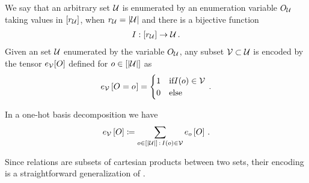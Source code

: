 \begin{definition}\label{def:subsetEncoding}
	We say that an arbitrary set $\mathcal{U}$ is enumerated by an enumeration variable $O_{\mathcal{U}}$ taking values in $[r_{\mathcal{U}}]$, when $r_{\mathcal{U}}=\left|\mathcal{U}\right|$ and there is a bijective function
	\begin{align*}
		I : [r_{\mathcal{U}}] \rightarrow \mathcal{U} \, .
	\end{align*}
	Given an set $\mathcal{U}$ enumerated by the variable $O_{\mathcal{U}}$, any subset $\mathcal{V}\subset\mathcal{U}$ is encoded by the tensor $e_{\mathcal{V}}[O]$ defined for $o\in[\left|\mathcal{U}\right|]$ as
	\begin{align*}
	 	e_{\mathcal{V}}\left[O_{}=o_{}\right]
		= \begin{cases}
		1 & \text{if} I(o) \in \mathcal{V} \\
		0 & \text{else}
		\end{cases} \, . 
	\end{align*}
\end{definition}

In a one-hot basis decomposition we have
\begin{align*}
	e_{\mathcal{V}}\left[O\right]
	\coloneqq \sum_{o\in[\left|\mathcal{U}\right|]\,:\,I(o)\in\mathcal{V}}e_{o}\left[O\right] \, .
\end{align*}


Since relations are subsets of cartesian products between two sets, their encoding is a straightforward generalization of .

